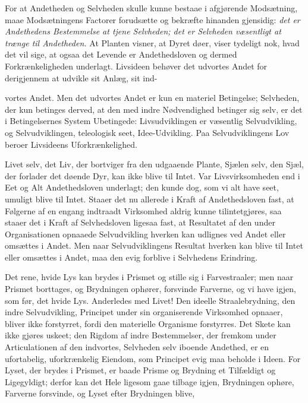 \documentclass[12pt,a4paper]{book}
\begin{document}
For at Andetheden og Selvheden skulle kunne bestaae i afgjørende Modsætning,
maae Modsætningens Factorer forudsætte og bekræfte hinanden gjensidig:
\emph{det er Andethedens Bestemmelse at tjene Selvheden; det er Selvheden
væsentligt at trænge til Andetheden.} At Planten visner, at Dyret døer, viser
tydeligt nok, hvad det vil sige, at ogsaa det Levende er Andethedsloven og
dermed Forkrænkeligheden underlagt. Livsideen behøver det udvortes Andet for
derigjennem at udvikle sit Anlæg, sit ind-

vortes Andet. Men det udvortes Andet er kun en materiel Betingelse; Selvheden,
der kun betinges derved, at den med indre Nødvendighed betinger sig selv, er
det i Betingelsernes System Ubetingede: Livsudviklingen er væsentlig
Selvudvikling, og Selvudviklingen, teleologisk seet, Idee-Udvikling. Paa
Selvudviklingens Lov beroer Livsideens Uforkrænkelighed.

Livet selv, det Liv, der bortviger fra den udgaaende Plante, Sjælen selv, den
Sjæl, der forlader det døende Dyr, kan ikke blive til Intet. Var
Livsvirksomheden end i Eet og Alt Andethedsloven underlagt; den kunde dog, som
vi alt have seet, umuligt blive til Intet. Staaer det nu allerede i Kraft af
Andethedsloven fast, at Følgerne af en engang indtraadt Virksomhed aldrig kunne
tilintetgjøres, saa staaer det i Kraft af Selvhedsloven ligesaa fast, at
Resultatet af den under Organisationen opnaaede Selvudvikling hverken kan
udlignes ved Andet eller omsættes i Andet. Men naar Selvudviklingens Resultat
hverken kan blive til Intet eller omsættes i Andet, maa den evig forblive i
Selvhedens Erindring.

Det rene, hvide Lys kan brydes i Prismet og stille sig i Farvestraaler; men
naar Prismet borttages, og Brydningen ophører, forsvinde Farverne, og vi have
igjen, som før, det hvide Lys. Anderledes med Livet! Den ideelle
Straalebrydning, den indre Selvudvikling, Principet under sin organiserende
Virksomhed opnaaer, bliver ikke forstyrret, fordi den materielle Organisme
forstyrres. Det Skete kan ikke gjøres uskeet; den Rigdom af indre
Bestemmelser, der fremkom under Articulationen af den indvortes, Selvheden selv
iboende Andethed, er en ufortabelig, uforkrænkelig Eiendom, som Principet evig
maa beholde i Ideen. For Lyset, der brydes i Prismet, er baade Prisme og
Brydning et Tilfældigt og Ligegyldigt; derfor kan det Hele ligesom gaae tilbage
igjen, Brydningen ophøre, Farverne forsvinde, og Lyset efter Brydningen blive,
\end{document}
